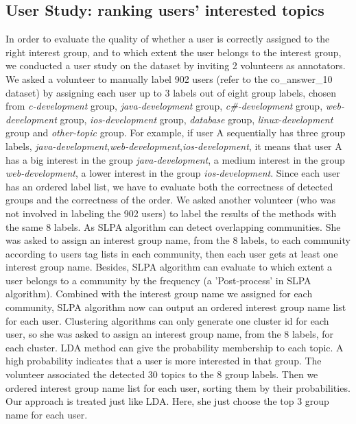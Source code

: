 \begin{sidewaystable}
\end{sidewaystable}



\subsection{User Study: ranking users' interested topics}
In order to evaluate the quality of whether a user is correctly assigned to the right interest group, and to which extent the user belongs to the interest group, we conducted a user study on the dataset by inviting 2 volunteers as annotators. We asked a volunteer to manually label 902 users (refer to the co\_answer\_10 dataset) by assigning each user up to 3 labels out of eight group labels, chosen from \textit{c-development} group, \textit{java-development} group, \textit{c\#-development} group, \textit{web-development} group, \textit{ios-development} group, \textit{database} group, \textit{linux-development} group and \textit{other-topic} group. 
For example, if user A sequentially has three group labels, \textit{java-development},\textit{web-development},\textit{ios-development}, it means that user A has a big interest in the group \textit{java-development}, a medium interest in the group \textit{web-development}, a lower interest in the group \textit{ios-development}. Since each user has an ordered label list, we have to evaluate both the correctness of detected groups and the correctness of the order. 
We asked another volunteer (who was not involved in labeling the 902 users) to label the results of the methods with the same 8 labels.
As SLPA algorithm can detect overlapping communities. She was asked to assign an interest group name, from the 8 labels, to each community according to users tag lists in each community, then each user gets at least one interest group name. Besides, SLPA algorithm can evaluate to which extent a user belongs to a community by the frequency (a 'Post-process' in SLPA algorithm). Combined with the interest group name we assigned for each community, SLPA algorithm now can output an ordered interest group name list for each user.
Clustering algorithms can only generate one cluster id for each user, so she was asked to assign an interest group name, from the 8 labels, for each cluster. 
LDA method can give the probability membership to each topic. A high probability indicates that a user is more interested in that group. The volunteer associated the detected 30 topics to the 8 group labels. Then we ordered interest group name list for each user, sorting them by their probabilities. Our approach is treated just like LDA. Here, she just choose the top 3 group name for each user. 
